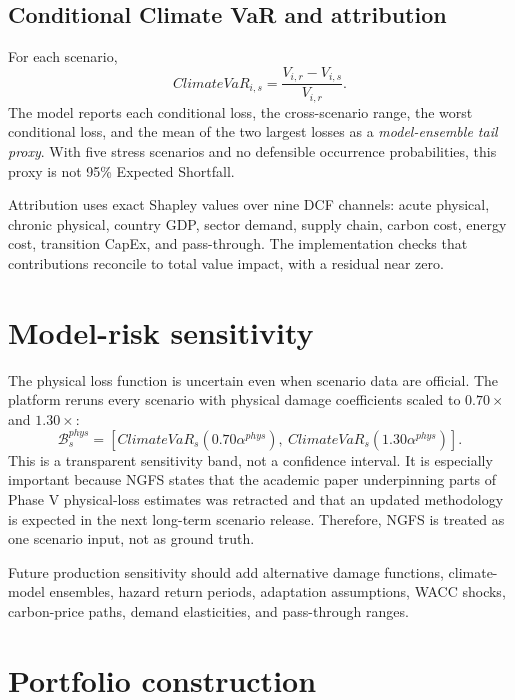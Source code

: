 \documentclass[10pt]{article}
\begin{document}
\subsection{Conditional Climate VaR and attribution}

For each scenario,
\begin{equation}
ClimateVaR_{i,s}=\frac{V_{i,r}-V_{i,s}}{V_{i,r}}.
\end{equation}
The model reports each conditional loss, the cross-scenario range, the worst conditional loss, and the mean of the two largest losses as a \emph{model-ensemble tail proxy}. With five stress scenarios and no defensible occurrence probabilities, this proxy is not 95\% Expected Shortfall.

Attribution uses exact Shapley values over nine DCF channels: acute physical, chronic physical, country GDP, sector demand, supply chain, carbon cost, energy cost, transition CapEx, and pass-through. The implementation checks that contributions reconcile to total value impact, with a residual near zero.

\section{Model-risk sensitivity}

The physical loss function is uncertain even when scenario data are official. The platform reruns every scenario with physical damage coefficients scaled to $0.70\times$ and $1.30\times$:
\begin{equation}
\mathcal{B}^{phys}_{s}=\left[ClimateVaR_s(0.70\alpha^{phys}),\ ClimateVaR_s(1.30\alpha^{phys})\right].
\end{equation}
This is a transparent sensitivity band, not a confidence interval. It is especially important because NGFS states that the academic paper underpinning parts of Phase V physical-loss estimates was retracted and that an updated methodology is expected in the next long-term scenario release. Therefore, NGFS is treated as one scenario input, not as ground truth.

Future production sensitivity should add alternative damage functions, climate-model ensembles, hazard return periods, adaptation assumptions, WACC shocks, carbon-price paths, demand elasticities, and pass-through ranges.

\section{Portfolio construction}
\end{document}
